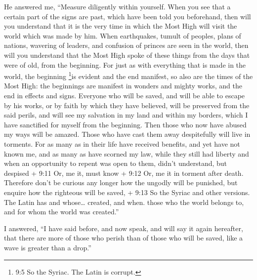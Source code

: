  He answered me, ``Measure diligently within yourself. When
you see that a certain part of the signs are past, which have been told
you beforehand,  then will you understand that it is the
very time in which the Most High will visit the world which was made by
him.  When earthquakes, tumult of peoples, plans of nations,
wavering of leaders, and confusion of princes are seen in the world,
 then will you understand that the Most High spoke of these
things from the days that were of old, from the beginning. 
For just as with everything that is made in the world, the beginning
\footnote{9:5 So the Syriac. The Latin is corrupt.}is evident and the
end manifest,  so also are the times of the Most High: the
beginnings are manifest in wonders and mighty works, and the end in
effects and signs.  Everyone who will be saved, and will be
able to escape by his works, or by faith by which they have believed,
 will be preserved from the said perils, and will see my
salvation in my land and within my borders, which I have sanctified for
myself from the beginning.  Then those who now have abused
my ways will be amazed. Those who have cast them away despitefully will
live in torments.  For as many as in their life have
received benefits, and yet have not known me,  and as many
as have scorned my law, while they still had liberty and when an
opportunity to repent was open to them, didn't understand, but despised
+ 9:11 Or, me it,  must know + 9:12 Or, me it in torment
after death.  Therefore don't be curious any longer how the
ungodly will be punished, but enquire how the righteous will be saved, +
9:13 So the Syriac and other versions. The Latin has and whose\ldots{}
created, and when. those who the world belongs to, and for whom the
world was created.''

 I answered,  ``I have said before, and now
speak, and will say it again hereafter, that there are more of those who
perish than of those who will be saved,  like a wave is
greater than a drop.''

